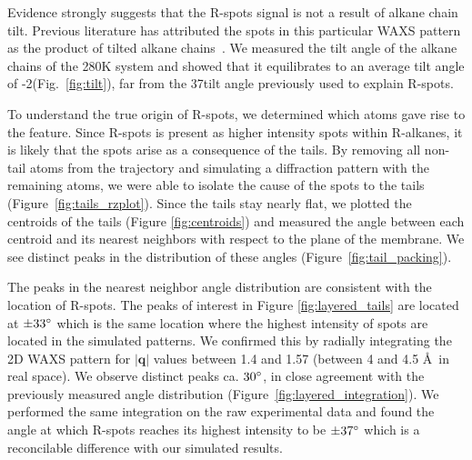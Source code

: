 \documentclass[journal=jpcbfk,manuscript=article]{achemso}
\begin{document}
  Evidence strongly suggests that the R-spots signal is not a result of alkane chain tilt. 
  Previous literature has attributed the spots in this particular WAXS pattern as the product 
  of tilted alkane chains~\cite{feng_scalable_2014}. We measured the tilt angle of the
  alkane chains of the 280K system and showed that it equilibrates to an average tilt angle of
  -2\degree (Fig.~\ref{fig:tilt}), far from the 37\degree tilt angle previously used to 
  explain R-spots. 

  To understand the true origin of R-spots, we determined which atoms gave rise to the 
  feature. Since R-spots is present as higher intensity spots within R-alkanes, it is
  likely that the spots arise as a consequence of the tails. By removing all non-tail atoms
  from the trajectory and simulating a diffraction pattern with the remaining atoms, we were
  able to isolate the cause of the spots to the tails (Figure~\ref{fig:tails_rzplot}). Since the 
  tails stay nearly flat, we plotted the centroids of the tails (Figure \ref{fig:centroids})
  and measured the angle between each centroid and its nearest neighbors with respect to the 
  plane of the membrane. We see distinct peaks in the distribution of these angles 
  (Figure~\ref{fig:tail_packing}).

  The peaks in the nearest neighbor angle distribution are consistent with the
  location of R-spots. The peaks of interest in Figure \ref{fig:layered_tails}
  are located at $\pm 33 \degree$ which is the same location where the highest
  intensity of spots are located in the simulated patterns. We confirmed this 
  by radially integrating the 2D WAXS pattern for 
  $\left|\mathbf{q}\right|$ values between 1.4 and 1.57 (between 4
  and 4.5 \AA~in real space). We observe distinct peaks ca. $30
  \degree$, in close agreement with the previously measured angle distribution
  (Figure~\ref{fig:layered_integration}). We performed the same integration on
  the raw experimental data and found the angle at which R-spots reaches its
  highest intensity to be $\pm 37 \degree$ which is a reconcilable difference
  with our simulated results.

\end{document}
